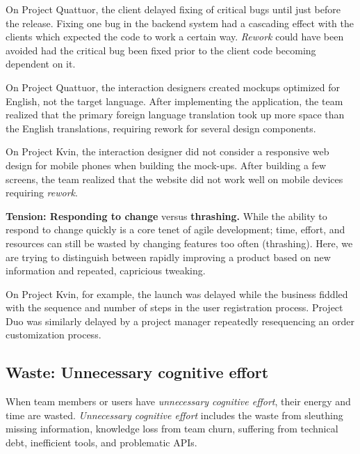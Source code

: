 On Project Quattuor, the client delayed fixing of critical bugs until just before the release. Fixing one bug in the backend system had a cascading effect with the clients which expected the code to work a certain way. \textit{Rework} could have been avoided had the critical bug been fixed prior to the client code becoming dependent on it.

On Project Quattuor, the interaction designers created mockups optimized for English, not the target language. After implementing the application, the team realized that the primary foreign language translation took up more space than the English translations, requiring rework for several design components. 

On Project Kvin, the interaction designer did not consider a responsive web design for mobile phones when building the mock-ups. After building a few screens, the team realized that the website did not work well on mobile devices requiring \textit{rework}.

\textbf{Tension: Responding to change} versus \textbf{thrashing.}
While the ability to respond to change quickly is a core tenet of agile development; time, effort, and resources can still be wasted by changing features too often (thrashing). Here, we are trying to distinguish between rapidly improving a product based on new information and repeated, capricious tweaking. 

On Project Kvin, for example, the launch was delayed while the business fiddled with the sequence and number of steps in the user registration process. Project Duo was similarly delayed by a project manager repeatedly resequencing an order customization process. 



\subsection{Waste: Unnecessary cognitive effort}
When team members or users have \textit{unnecessary cognitive effort}, their energy and time are wasted. \textit{Unnecessary cognitive effort} includes the waste from sleuthing missing information, knowledge loss from team churn, suffering from technical debt, inefficient tools, and problematic APIs.

